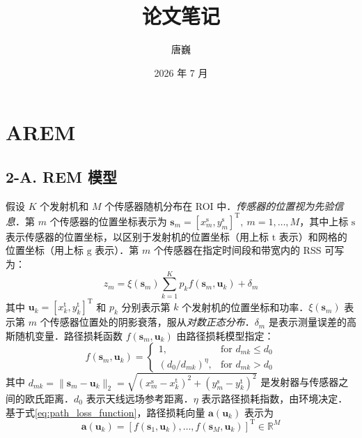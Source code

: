 \documentclass[a4paper,zihao=-4]{ctexart}
\title{论文笔记}
\author{唐巍}
\date{2026 年 7 月}
\renewcommand{\mathbf}[1]{\symbf{#1}}
\begin{document}
\maketitle
\tableofcontents

\newpage

\section{AREM}

\subsection{2-A. REM 模型}

假设 $K$ 个发射机和 $M$ 个传感器随机分布在 ROI 中．\emph{传感器的位置视为先验信息}．第 $m$ 个传感器的位置坐标表示为 $\mathbf{s}_m = [x_m^\mathrm{s}, y_m^\mathrm{s}]^\mathrm{T},\ m = 1, \dots, M$，其中上标 $\mathrm{s}$ 表示传感器的位置坐标，以区别于发射机的位置坐标（用上标 $\mathrm{t}$ 表示）和网格的位置坐标（用上标 $\mathrm{g}$ 表示）．第 $m$ 个传感器在指定时间段和带宽内的 RSS 可写为：
\begin{equation}
	\label{eq:rss_measurement}
	z_m = \xi(\mathbf{s}_m) \sum_{k=1}^{K} p_k f(\mathbf{s}_m, \mathbf{u}_k) + \delta_m
\end{equation}
其中 $\mathbf{u}_k = [x_k^\mathrm{t}, y_k^\mathrm{t}]^\mathrm{T}$ 和 $p_k$ 分别表示第 $k$ 个发射机的位置坐标和功率．$\xi(\mathbf{s}_m)$ 表示第 $m$ 个传感器位置处的阴影衰落，服从\emph{对数正态分布}．$\delta_m$ 是表示测量误差的高斯随机变量．路径损耗函数 $f(\mathbf{s}_m, \mathbf{u}_k)$ 由路径损耗模型指定：
\begin{equation}
	\label{eq:path_loss_function}
	f(\mathbf{s}_m, \mathbf{u}_k) =
	\begin{cases}
		1,                              & \text{for } d_{mk} \leq d_0 \\
		\left(d_0 / d_{mk}\right)^\eta, & \text{for } d_{mk} > d_0
	\end{cases}
\end{equation}
其中 $d_{mk} = \|\mathbf{s}_m - \mathbf{u}_k\|_2 = \sqrt{(x_m^\mathrm{s} - x_k^\mathrm{t})^2 + (y_m^\mathrm{s} - y_k^\mathrm{t})^2}$ 是发射器与传感器之间的欧氏距离．$d_0$ 表示天线远场参考距离．$\eta$ 表示路径损耗指数，由环境决定．基于式\eqref{eq:path_loss_function}，路径损耗向量 $\mathbf{a}(\mathbf{u}_k)$ 表示为
\begin{equation}
	\label{eq:path_loss_vector}
	\mathbf{a}(\mathbf{u}_k) = \left[ f(\mathbf{s}_1, \mathbf{u}_k), \dots, f(\mathbf{s}_M, \mathbf{u}_k) \right]^\mathrm{T} \in \mathbb{R}^M
\end{equation}
\end{document}
